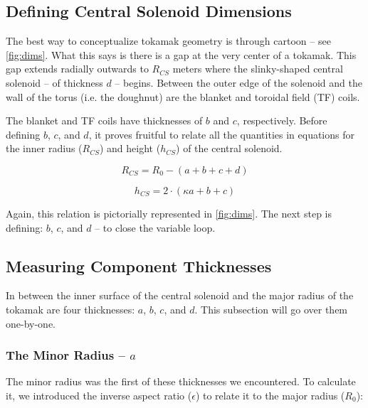 \subsection{Defining Central Solenoid Dimensions}

The best way to conceptualize tokamak geometry is through cartoon -- see \cref{fig:dims}. What this says is there is a gap at the very center of a tokamak. This gap extends radially outwards to $R_{CS}$ meters where the slinky-shaped central solenoid -- of thickness $d$ -- begins. Between the outer edge of the solenoid and the wall of the torus (i.e. the doughnut) are the blanket and toroidal field (TF) coils.

\begin{figure*}
\centering

\caption{Dimensions of Tokamak Cross-Section}
\label{fig:dims}
\end{figure*}

The blanket and TF coils have thicknesses of $b$ and $c$, respectively. Before defining $b$, $c$, and $d$, it proves fruitful to relate all the quantities in equations for the inner radius ($R_{CS}$) and height ($h_{CS}$) of the central solenoid.
 
 \begin{equation}
 	\label{eq:rcs1}
 	R_{CS} = R_0 - ( a + b + c + d )
 \end{equation}
 
 \begin{equation}
	\label{eq:hcs1}
 	h_{CS} = 2 \cdot \left ( \kappa a + b + c \right)
 \end{equation}

Again, this relation is pictorially represented in \cref{fig:dims}. The next step is defining: $b$, $c$, and $d$ -- to close the variable loop.

\subsection{Measuring Component Thicknesses}
 
In between the inner surface of the central solenoid and the major radius of the tokamak are four thicknesses: $a$, $b$, $c$, and $d$. This subsection will go over them one-by-one.
 
\subsubsection{The Minor Radius -- $a$}

The minor radius was the first of these thicknesses we encountered. To calculate it, we introduced the inverse aspect ratio ($\epsilon$) to relate it to the major radius ($R_0$):

